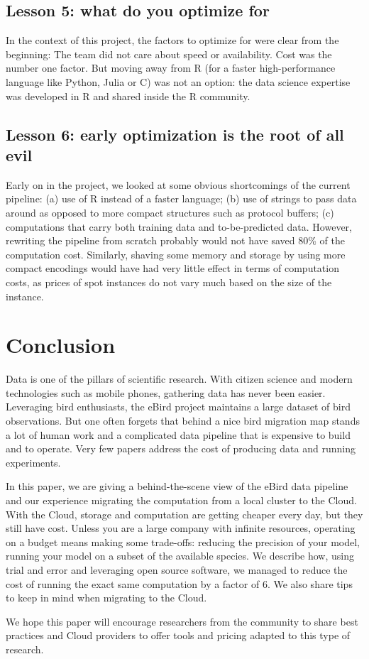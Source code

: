 \documentclass{acm_proc_article-sp}
\begin{document}
\subsection*{Lesson 5: what do you optimize for}
In the context of this project, the factors to optimize for were clear from the beginning:
The team did not care about speed or availability.
Cost was the number one factor.
But moving away from R (for a faster high-performance language like Python, Julia or C) was not an option: the data science expertise was developed in R and shared inside the R community.

\subsection*{Lesson 6: early optimization is the root of all evil}
Early on in the project, we looked at some obvious shortcomings of the current pipeline: (a) use of R instead of a faster language; (b) use of strings to pass data around as opposed to more compact structures such as protocol buffers; (c) computations that carry both training data and to-be-predicted data.
However, rewriting the pipeline from scratch probably would not have saved 80\% of the computation cost. Similarly, shaving some memory and storage by using more compact encodings would have had very little effect in terms of computation costs, as prices of spot instances  do not vary much based on the size of the instance.

\section{Conclusion}
Data is one of the pillars of scientific research. With citizen science and modern technologies such as mobile phones, gathering data has never been easier. Leveraging bird enthusiasts, the eBird project maintains a large dataset of bird observations. But one often forgets that behind a nice bird migration map stands a lot of human work and a complicated data pipeline that is expensive to build and to operate. Very few papers address the cost of producing data and running experiments.

In this paper, we are giving a behind-the-scene view of the eBird data pipeline and our experience migrating the computation from a local cluster to the Cloud. With the Cloud, storage and computation are getting cheaper every day, but they still have cost. Unless you are a large company with infinite resources, operating on a budget means making some trade-offs: reducing the precision of your model, running your model on a subset of the available species.
We describe how, using trial and error and leveraging open source software, we managed to reduce the cost of running the exact same computation by a factor of 6. We also share tips to keep in mind when migrating to the Cloud.

We hope this paper will encourage researchers from the community to share best practices and Cloud providers to offer tools and pricing adapted to this type of research.




\vspace{2.5mm}

\end{document}
